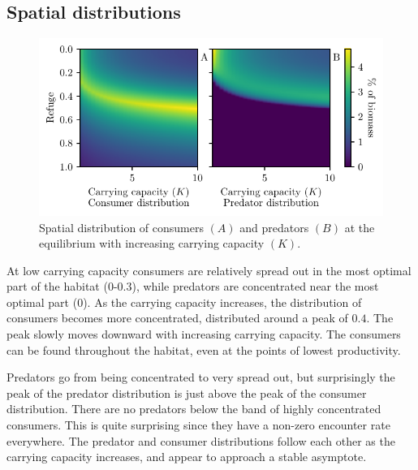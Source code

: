 \subsection{Spatial distributions}
\begin{figure}[H]
  \caption{Spatial distribution of consumers $(A)$ and predators $(B)$ at the equilibrium with increasing carrying capacity $(K)$.}
  \label{fig:strat_car}
  \includegraphics{plots/increasing_car_cap_c.pdf}
\end{figure}

At low carrying capacity consumers are relatively spread out in the most optimal part of the habitat (0-0.3), while predators are concentrated near the most optimal part (0). As the carrying capacity increases, the distribution of consumers becomes more concentrated, distributed around a peak of $0.4$. The peak slowly moves downward with increasing carrying capacity. The consumers can be found throughout the habitat, even at the points of lowest productivity.


Predators go from being concentrated to very spread out, but surprisingly the peak of the predator distribution is just above the peak of the consumer distribution. There are no predators below the band of highly concentrated consumers. This is quite surprising since they have a non-zero encounter rate everywhere. The predator and consumer distributions follow each other as the carrying capacity increases, and appear to approach a stable asymptote.


